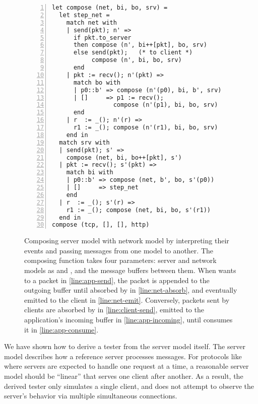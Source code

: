 \begin{figure}
  \begin{lstlisting}[style=customcoq,numbers=left,stepnumber=1,escapechar=\%]
let compose (net, bi, bo, srv) =
  let step_net =
    match net with
    | send(pkt); n' =>
      if pkt.to_server
      then compose (n', bi++[pkt], bo, srv)
      else send(pkt);   (* to client *)
           compose (n', bi, bo, srv)
      end
    | pkt := recv(); n'(pkt) =>
      match bo with
      | p0::b' => compose (n'(p0), bi, b', srv)
      | []     => p1 := recv();
                 compose (n'(p1), bi, bo, srv)
      end
    | r  := _(); n'(r) =>
      r1 := _(); compose (n'(r1), bi, bo, srv)
    end in
  match srv with
  | send(pkt); s' =>
    compose (net, bi, bo++[pkt], s')
  | pkt := recv(); s'(pkt) =>
    match bi with
    | p0::b' => compose (net, b', bo, s'(p0))
    | []     => step_net
    end
  | r  := _(); s'(r) =>
    r1 := _(); compose (net, bi, bo, s'(r1))
  end in
compose (tcp, [], [], http)
  \end{lstlisting}
  \caption{Composing  server model with  network model by interpreting
    their events and passing messages from one model to another.  The composing
    function takes four parameters: server and network models as  and ,
    and the message buffers between them.  When  wants to  a
    packet in \autoref{line:app-send}, the packet is appended to the outgoing
    buffer  until absorbed by  in \autoref{line:net-absorb},
    and eventually emitted to the client in \autoref{line:net-emit}.
    Conversely, packets sent by clients are absorbed by  in
    \autoref{line:client-send}, emitted to the application's incoming buffer
     in \autoref{line:app-incoming}, until  consumes it in
    \autoref{line:app-consume}.
  }
\end{figure}
We have shown how to derive a tester from the server model itself.
The server model describes how a reference server processes messages.  For
protocols like \http where servers are expected to handle one request at a time,
a reasonable server model should be ``linear'' that serves one client after another.
As a result, the derived tester only simulates a single client, and does not
attempt to observe the server's behavior via multiple simultaneous connections.

